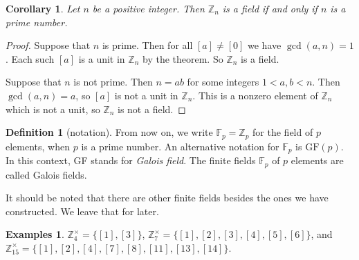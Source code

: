 \documentclass[11pt]{article}
\newtheorem{cor}[thm]{Corollary}
\theoremstyle{definition}
\newtheorem{defn}[thm]{Definition}
\newtheorem{examples}[thm]{Examples}
\newcommand{\Z}{\mathbb{Z}} %
\newcommand{\F}{{\mathbb F}}
\begin{document}
\begin{cor}
  Let $n$ be a positive integer. Then $\Z_n$ is a field if and only if
  $n$ is a prime number.
\end{cor}

\begin{proof}
Suppose that $n$ is prime. Then for all $[a] \ne [0]$ we have
$\gcd(a,n) = 1$. Each such $[a]$ is a unit in $\Z_n$ by the
theorem. So $\Z_n$ is a field.

Suppose that $n$ is not prime. Then $n = ab$ for some integers $1 <
a,b < n$. Then $\gcd(a,n) = a$, so $[a]$ is not a unit in $\Z_n$. This
is a nonzero element of $\Z_n$ which is not a unit, so $\Z_n$ is not a
field.
\end{proof}


\begin{defn}[notation]
  From now on, we write $\F_p = \Z_p$\index{F@$\F_p$} for the field of
  $p$ elements, when $p$ is a prime number. An alternative notation
  for $\F_p$ is $\text{GF}(p)$. In this
  context, GF stands for \emph{Galois field}.  The finite fields
  $\F_p$ of $p$ elements are called Galois fields.
\end{defn}

It should be noted that there are other finite fields besides the ones
we have constructed. We leave that for later.

\begin{examples}
 $\Z_4^\times = \{[1], [3] \}$,
 $\Z_7^\times = \{[1],[2],[3],[4],[5],[6] \}$, and
\\
 $\Z_{15}^\times = \{[1], [2], [4], [7], [8], [11], [13], [14] \}$.
\end{examples}
\end{document}
